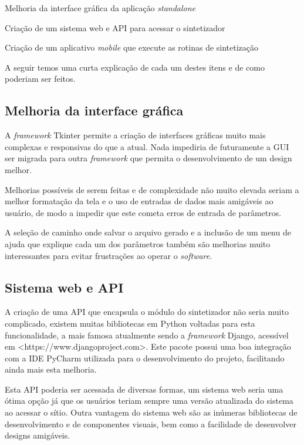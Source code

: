 \documentclass[
  12pt,       
  openright,      
  twoside,      
  a4paper,      
  english,      
  french,       
  spanish,      
  brazil,     
  ]{abntex2}
\begin{document}
\begin{alineas}
\item Melhoria da interface gráfica da aplicação \textit{standalone}
\item Criação de um sistema web e API para acessar o sintetizador
\item Criação de um aplicativo \textit{mobile} que execute as rotinas de sintetização
\end{alineas}

A seguir temos uma curta explicação de cada um destes itens e de como poderiam ser feitos.

\subsection{Melhoria da interface gráfica}
A \textit{framework} Tkinter permite a criação de interfaces gráficas muito mais complexas e responsivas do que a atual. Nada impediria de futuramente a GUI ser migrada para outra \textit{framework} que permita o desenvolvimento de um design melhor.

Melhorias possíveis de serem feitas e de complexidade não muito elevada seriam a melhor formatação da tela e o uso de entradas de dados mais amigáveis ao usuário, de modo a impedir que este cometa erros de entrada de parâmetros.

A seleção de caminho onde salvar o arquivo gerado e a inclusão de um menu de ajuda que explique cada um dos parâmetros também são melhorias muito interessantes para evitar frustrações ao operar o \textit{software}.

\subsection{Sistema web e API}
A criação de uma API que encapsula o módulo do sintetizador não seria muito complicado, existem muitas bibliotecas em Python voltadas para esta funcionalidade, a mais famosa atualmente sendo a \textit{framework} Django, acessível em <https://www.djangoproject.com>. Este pacote possui uma boa integração com a IDE PyCharm \cite{pycharm} utilizada para o desenvolvimento do projeto, facilitando ainda mais esta melhoria.

Esta API poderia ser acessada de diversas formas, um sistema web seria uma ótima opção já que os usuários teriam sempre uma versão atualizada do sistema ao acessar o sítio. Outra vantagem do sistema web são as inúmeras bibliotecas de desenvolvimento e de componentes visuais, bem como a facilidade de desenvolver designs amigáveis.
\end{document}
